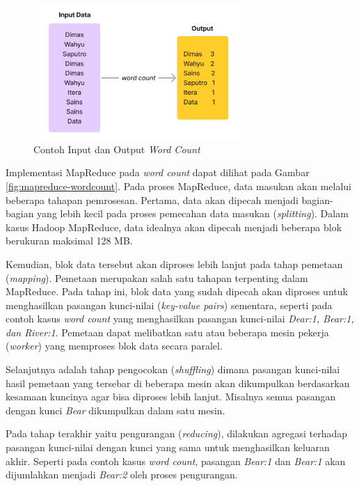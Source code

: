 \begin{figure}[h]
    \centering
    \includegraphics[width=0.7\textwidth]{figures/ch02/sample-wordcount.png}
    \caption{Contoh Input dan Output \textit{Word Count}}
    \label{fig:sample-wordcount}
\end{figure}

Implementasi MapReduce pada \textit{word count} dapat dilihat pada Gambar \ref{fig:mapreduce-wordcount}. Pada proses MapReduce, data masukan akan melalui beberapa tahapan pemrosesan. Pertama, data akan dipecah menjadi bagian-bagian yang lebih kecil pada proses pemecahan data masukan (\textit{splitting}). Dalam kasus Hadoop MapReduce, data idealnya akan dipecah menjadi beberapa blok berukuran maksimal 128 MB.

Kemudian, blok data tersebut akan diproses lebih lanjut pada tahap pemetaan (\textit{mapping}). Pemetaan merupakan salah satu tahapan terpenting dalam MapReduce. Pada tahap ini, blok data yang sudah dipecah akan diproses untuk menghasilkan pasangan kunci-nilai (\textit{key-value pairs}) sementara, seperti pada contoh kasus \textit{word count} yang menghasilkan pasangan kunci-nilai \textit{Dear:1, Bear:1, dan River:1}. Pemetaan dapat melibatkan satu atau beberapa mesin pekerja (\textit{worker}) yang memproses blok data secara paralel.

Selanjutnya adalah tahap pengocokan (\textit{shuffling}) dimana pasangan kunci-nilai hasil pemetaan yang tersebar di beberapa mesin akan dikumpulkan berdasarkan kesamaan kuncinya agar bisa diproses lebih lanjut. Misalnya semua pasangan dengan kunci \textit{Bear} dikumpulkan dalam satu mesin.

Pada tahap terakhir yaitu pengurangan (\textit{reducing}), dilakukan agregasi terhadap pasangan kunci-nilai dengan kunci yang sama untuk menghasilkan keluaran akhir. Seperti pada contoh kasus \textit{word count}, pasangan \textit{Bear:1} dan \textit{Bear:1} akan dijumlahkan menjadi \textit{Bear:2} oleh proses pengurangan.

